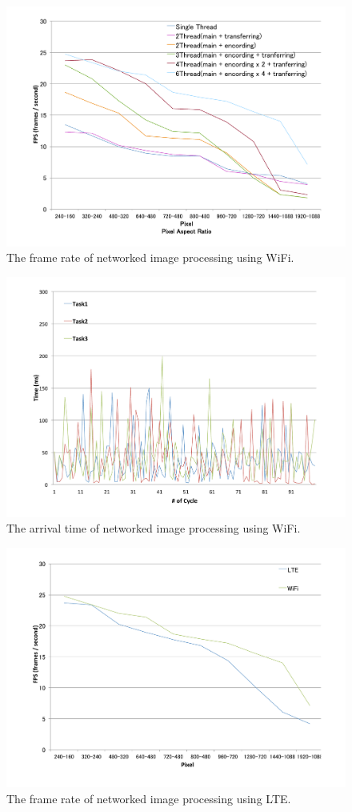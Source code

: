 \begin{figure}[!t]
 \centering
 \includegraphics[width=0.8\hsize]{fig/No8_TIPiC_FPS_graph_WiFi.pdf}
 \caption{The frame rate of networked image processing using WiFi.}
 \label{fig:no8}
\end{figure}

\begin{figure}[!t]
 \centering
 \includegraphics[width=0.8\hsize]{fig/No9_TIPiC_serv_cycle_WiFi.pdf}
 \caption{The arrival time of networked image processing using WiFi.}
 \label{fig:no9}
\end{figure}

\begin{figure}[!t]
 \centering
 \includegraphics[width=0.8\hsize]{fig/No10_TIPiC_FPS_graph_LTE.pdf}
 \caption{The frame rate of networked image processing using LTE.}
 \label{fig:no10}
\end{figure}

